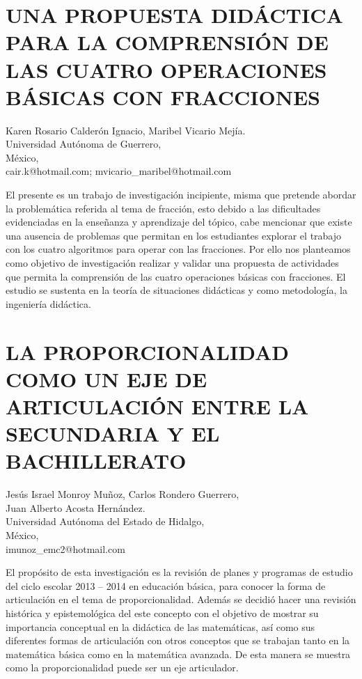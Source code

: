 \section{UNA PROPUESTA DIDÁCTICA PARA LA COMPRENSIÓN DE LAS CUATRO OPERACIONES
BÁSICAS CON FRACCIONES}

\begin{datos}
Karen Rosario Calderón Ignacio, Maribel Vicario Mejía.\\
Universidad Autónoma de Guerrero,\\
\hfill México, \\
\hfill cair.k@hotmail.com; mvicario\_{}maribel@hotmail.com
\end{datos}

El presente es un trabajo de investigación incipiente, misma que pretende
abordar la problemática referida al tema de fracción, esto debido
a las dificultades evidenciadas en la enseñanza y aprendizaje del
tópico, cabe mencionar que existe una ausencia de problemas que permitan
en los estudiantes explorar el trabajo con los cuatro algoritmos para
operar con las fracciones. Por ello nos planteamos como objetivo de
investigación realizar y validar una propuesta de actividades que
permita la comprensión de las cuatro operaciones básicas con fracciones.
El estudio se sustenta en la teoría de situaciones didácticas y como
metodología, la ingeniería didáctica. 


\section{LA PROPORCIONALIDAD COMO UN EJE DE ARTICULACIÓN ENTRE LA SECUNDARIA
Y EL BACHILLERATO}

\begin{datos}
Jesús Israel Monroy Muñoz, Carlos Rondero Guerrero,\\
Juan Alberto Acosta Hernández.\\
Universidad Autónoma del Estado de Hidalgo,\\
\hfill México, \\
\hfill imunoz\_{}emc2@hotmail.com
\end{datos}

El propósito de esta investigación es la revisión de planes y programas
de estudio del ciclo escolar 2013 – 2014 en educación básica, para
conocer la forma de articulación en el tema de proporcionalidad. Además
se decidió hacer una revisión histórica y epistemológica del este
concepto con el objetivo de mostrar su importancia conceptual en la
didáctica de las matemáticas, así como sus diferentes formas de articulación
con otros conceptos que se trabajan tanto en la matemática básica
como en la matemática avanzada. De esta manera se muestra como la
proporcionalidad puede ser un eje articulador.


